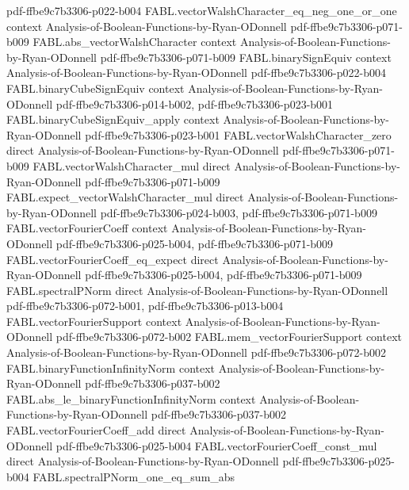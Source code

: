 \begin{theorem}
  {pdf-ffbe9c7b3306-p022-b004}
\proofstep
  {FABL.vectorWalshCharacter_eq_neg_one_or_one}
  {context}
  {Analysis-of-Boolean-Functions-by-Ryan-ODonnell}
  {pdf-ffbe9c7b3306-p071-b009}
\proofstep
  {FABL.abs_vectorWalshCharacter}
  {context}
  {Analysis-of-Boolean-Functions-by-Ryan-ODonnell}
  {pdf-ffbe9c7b3306-p071-b009}
\proofstep
  {FABL.binarySignEquiv}
  {context}
  {Analysis-of-Boolean-Functions-by-Ryan-ODonnell}
  {pdf-ffbe9c7b3306-p022-b004}
\proofstep
  {FABL.binaryCubeSignEquiv}
  {context}
  {Analysis-of-Boolean-Functions-by-Ryan-ODonnell}
  {pdf-ffbe9c7b3306-p014-b002,
    pdf-ffbe9c7b3306-p023-b001}
\proofstep
  {FABL.binaryCubeSignEquiv_apply}
  {context}
  {Analysis-of-Boolean-Functions-by-Ryan-ODonnell}
  {pdf-ffbe9c7b3306-p023-b001}
\proofstep
  {FABL.vectorWalshCharacter_zero}
  {direct}
  {Analysis-of-Boolean-Functions-by-Ryan-ODonnell}
  {pdf-ffbe9c7b3306-p071-b009}
\proofstep
  {FABL.vectorWalshCharacter_mul}
  {direct}
  {Analysis-of-Boolean-Functions-by-Ryan-ODonnell}
  {pdf-ffbe9c7b3306-p071-b009}
\proofstep
  {FABL.expect_vectorWalshCharacter_mul}
  {direct}
  {Analysis-of-Boolean-Functions-by-Ryan-ODonnell}
  {pdf-ffbe9c7b3306-p024-b003,
    pdf-ffbe9c7b3306-p071-b009}
\proofstep
  {FABL.vectorFourierCoeff}
  {context}
  {Analysis-of-Boolean-Functions-by-Ryan-ODonnell}
  {pdf-ffbe9c7b3306-p025-b004,
    pdf-ffbe9c7b3306-p071-b009}
\proofstep
  {FABL.vectorFourierCoeff_eq_expect}
  {direct}
  {Analysis-of-Boolean-Functions-by-Ryan-ODonnell}
  {pdf-ffbe9c7b3306-p025-b004,
    pdf-ffbe9c7b3306-p071-b009}
\proofstep
  {FABL.spectralPNorm}
  {direct}
  {Analysis-of-Boolean-Functions-by-Ryan-ODonnell}
  {pdf-ffbe9c7b3306-p072-b001,
    pdf-ffbe9c7b3306-p013-b004}
\proofstep
  {FABL.vectorFourierSupport}
  {context}
  {Analysis-of-Boolean-Functions-by-Ryan-ODonnell}
  {pdf-ffbe9c7b3306-p072-b002}
\proofstep
  {FABL.mem_vectorFourierSupport}
  {context}
  {Analysis-of-Boolean-Functions-by-Ryan-ODonnell}
  {pdf-ffbe9c7b3306-p072-b002}
\proofstep
  {FABL.binaryFunctionInfinityNorm}
  {context}
  {Analysis-of-Boolean-Functions-by-Ryan-ODonnell}
  {pdf-ffbe9c7b3306-p037-b002}
\proofstep
  {FABL.abs_le_binaryFunctionInfinityNorm}
  {context}
  {Analysis-of-Boolean-Functions-by-Ryan-ODonnell}
  {pdf-ffbe9c7b3306-p037-b002}
\proofstep
  {FABL.vectorFourierCoeff_add}
  {direct}
  {Analysis-of-Boolean-Functions-by-Ryan-ODonnell}
  {pdf-ffbe9c7b3306-p025-b004}
\proofstep
  {FABL.vectorFourierCoeff_const_mul}
  {direct}
  {Analysis-of-Boolean-Functions-by-Ryan-ODonnell}
  {pdf-ffbe9c7b3306-p025-b004}
\proofstep
  {FABL.spectralPNorm_one_eq_sum_abs}

\end{theorem}

